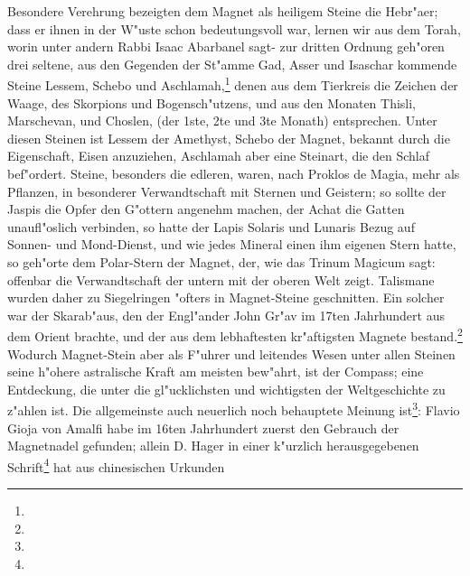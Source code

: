 \documentclass[a4paper, 11pt, oneside, polutonikogreek, german]{article}
\begin{document}
Besondere Verehrung bezeigten dem Magnet als heiligem Steine die Hebr"aer; dass er ihnen in der W"uste schon bedeutungsvoll war, lernen wir aus dem Torah, worin unter andern Rabbi Isaac Abarbanel sagt- zur dritten Ordnung geh"oren drei seltene, aus den Gegenden der St"amme Gad, Asser und Isaschar kommende Steine Lessem, Schebo und Aschlamah,\footnote{} denen aus dem Tierkreis die Zeichen der Waage, des Skorpions und Bogensch"utzens, und aus den Monaten Thisli, Marschevan, und Choslen, (der 1ste, 2te und 3te Monath) entsprechen. Unter diesen Steinen ist Lessem der Amethyst, Schebo der Magnet, bekannt durch die Eigenschaft, Eisen anzuziehen, Aschlamah aber eine Steinart, die den Schlaf bef"ordert. Steine, besonders die edleren, waren, nach Proklos de Magia, mehr als Pflanzen, in besonderer Verwandtschaft mit Sternen und Geistern; so sollte der Jaspis die Opfer den G"ottern angenehm machen, der Achat die Gatten unaufl"oslich verbinden, so hatte der Lapis Solaris und Lunaris Bezug auf Sonnen- und Mond-Dienst, und wie jedes Mineral einen ihm eigenen Stern hatte, so geh"orte dem Polar-Stern der Magnet, der, wie das Trinum Magicum sagt: offenbar die Verwandtschaft der untern mit der oberen Welt zeigt. Talismane wurden daher zu Siegelringen "ofters in Magnet-Steine geschnitten. Ein solcher war der Skarab"aus, den der Engl"ander John Gr"av im 17ten Jahrhundert aus dem Orient brachte, und der aus dem lebhaftesten kr"aftigsten Magnete bestand.\footnote{} Wodurch Magnet-Stein aber als F"uhrer und leitendes Wesen unter allen Steinen seine h"ohere astralische Kraft am meisten bew"ahrt, ist der Compass; eine Entdeckung, die unter die gl"ucklichsten und wichtigsten der Weltgeschichte zu z"ahlen ist. Die allgemeinste auch neuerlich noch behauptete Meinung ist\footnote{}: Flavio Gioja von Amalfi habe im 16ten Jahrhundert zuerst den Gebrauch der Magnetnadel gefunden; allein D. Hager in einer k"urzlich herausgegebenen Schrift\footnote{} hat aus chinesischen Urkunden 
\end{document}
